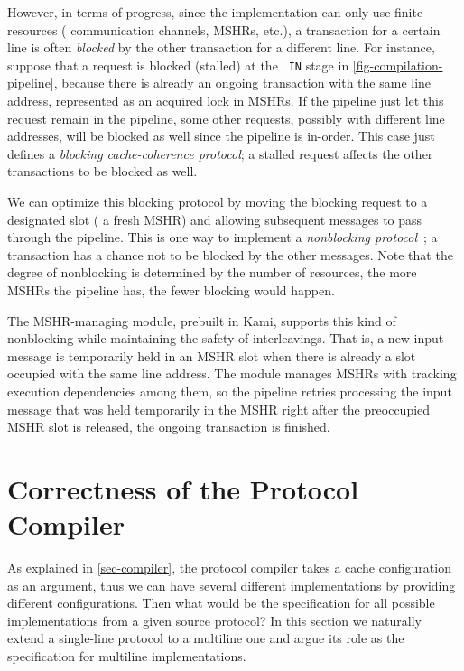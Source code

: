 However, in terms of progress, since the implementation can only use finite resources (\eg{} communication channels, MSHRs, etc.), a transaction for a certain line is often \emph{blocked} by the other transaction for a different line.
For instance, suppose that a request is blocked (stalled) at the {\small\tt\color{myblue} IN} stage in \autoref{fig-compilation-pipeline}, because there is already an ongoing transaction with the same line address, represented as an acquired lock in MSHRs.
If the pipeline just let this request remain in the pipeline, some other requests, possibly with different line addresses, will be blocked as well since the pipeline is in-order.
This case just defines a \emph{blocking cache-coherence protocol}; a stalled request affects the other transactions to be blocked as well.

We can optimize this blocking protocol by moving the blocking request to a designated slot (\eg{} a fresh MSHR) and allowing subsequent messages to pass through the pipeline.
This is one way to implement a \emph{nonblocking protocol}~\cite{cacheNonblocking,cacheNonblocking2,cacheNonblocking3}; a transaction has a chance not to be blocked by the other messages.
Note that the degree of nonblocking is determined by the number of resources, \eg{} the more MSHRs the pipeline has, the fewer blocking would happen.

The MSHR-managing module, prebuilt in Kami, supports this kind of nonblocking while maintaining the safety of interleavings.
That is, a new input message is temporarily held in an MSHR slot when there is already a slot occupied with the same line address.
The module manages MSHRs with tracking execution dependencies among them, so the pipeline retries processing the input message that was held temporarily in the MSHR right after the preoccupied MSHR slot is released, \ie{} the ongoing transaction is finished.

\section{Correctness of the Protocol Compiler}
\label{sec-compiler-correctness}

As explained in \autoref{sec-compiler}, the protocol compiler takes a cache configuration as an argument, thus we can have several different implementations by providing different configurations.
Then what would be the specification for all possible implementations from a given source protocol?
In this section we naturally extend a single-line \hemiola{} protocol to a multiline one and argue its role as the specification for multiline implementations.

